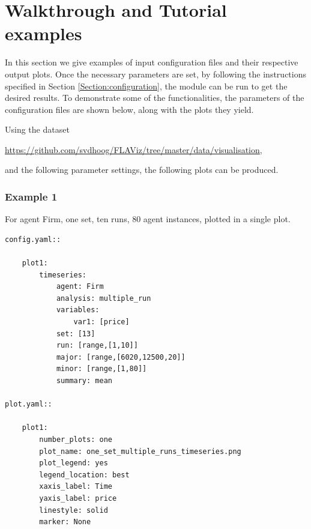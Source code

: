 \documentclass[10pt,a4paper]{article}
\begin{document}
\clearpage
\section{Walkthrough and Tutorial examples}


In this section we give examples of input configuration files and their respective output plots.
Once the necessary parameters are set, by following the instructions specified in Section \ref{Section:configuration}, the module can be run to get the desired results. To demonstrate some of the functionalities, the parameters of the configuration files are shown below, along with the plots they yield.

Using the dataset

 \url{https://github.com/svdhoog/FLAViz/tree/master/data/visualisation},
 
 and the following parameter settings, the following plots can be produced.

\clearpage
\subsubsection{Example 1}
For agent Firm, one set, ten runs, 80 agent instances, plotted in a single plot.

\begin{lstlisting}
config.yaml::

    plot1:
        timeseries:
            agent: Firm
            analysis: multiple_run
            variables:
                var1: [price]
            set: [13]
            run: [range,[1,10]]
            major: [range,[6020,12500,20]]
            minor: [range,[1,80]] 
            summary: mean

plot.yaml::

    plot1:
        number_plots: one
        plot_name: one_set_multiple_runs_timeseries.png
        plot_legend: yes
        legend_location: best
        xaxis_label: Time
        yaxis_label: price
        linestyle: solid
        marker: None
\end{lstlisting}
\end{document}
